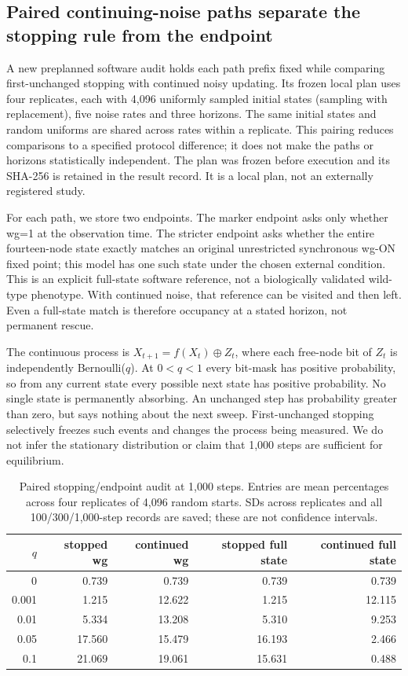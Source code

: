 \subsection{Paired continuing-noise paths separate the stopping rule from the endpoint}
A new preplanned software audit holds each path prefix fixed while comparing first-unchanged stopping with continued noisy updating. Its frozen local plan uses four replicates, each with 4,096 uniformly sampled initial states (sampling with replacement), five noise rates and three horizons. The same initial states and random uniforms are shared across rates within a replicate. This pairing reduces comparisons to a specified protocol difference; it does not make the paths or horizons statistically independent. The plan was frozen before execution and its SHA-256 is retained in the result record. It is a local plan, not an externally registered study.

For each path, we store two endpoints. The marker endpoint asks only whether wg=1 at the observation time. The stricter endpoint asks whether the entire fourteen-node state exactly matches an original unrestricted synchronous wg-ON fixed point; this model has one such state under the chosen external condition. This is an explicit full-state software reference, not a biologically validated wild-type phenotype. With continued noise, that reference can be visited and then left. Even a full-state match is therefore occupancy at a stated horizon, not permanent rescue.

The continuous process is $X_{t+1}=f(X_t)\oplus Z_t$, where each free-node bit of $Z_t$ is independently Bernoulli($q$). At $0<q<1$ every bit-mask has positive probability, so from any current state every possible next state has positive probability. No single state is permanently absorbing. An unchanged step has probability greater than zero, but says nothing about the next sweep. First-unchanged stopping selectively freezes such events and changes the process being measured. We do not infer the stationary distribution or claim that 1,000 steps are sufficient for equilibrium.

\begin{table}[ht]
\centering\small
\caption{Paired stopping/endpoint audit at 1,000 steps. Entries are mean percentages across four replicates of 4,096 random starts. SDs across replicates and all 100/300/1,000-step records are saved; these are not confidence intervals.}
\begin{tabular}{rrrrr}\toprule
$q$ & stopped wg & continued wg & stopped full state & continued full state\\\midrule
0 & 0.739 & 0.739 & 0.739 & 0.739 \\
0.001 & 1.215 & 12.622 & 1.215 & 12.115 \\
0.01 & 5.334 & 13.208 & 5.310 & 9.253 \\
0.05 & 17.560 & 15.479 & 16.193 & 2.466 \\
0.1 & 21.069 & 19.061 & 15.631 & 0.488 \\
\bottomrule\end{tabular}\end{table}

